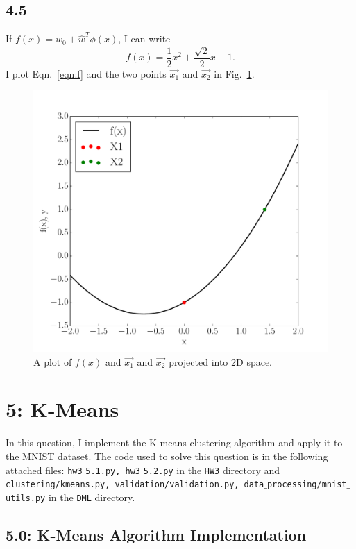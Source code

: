 \documentclass[12pt]{amsart}
\begin{document}
\subsection*{4.5}
If $f(x) = w_0 + \hat{w}^T \phi(x)$, I can write
\begin{equation} \label{eqn:f}
f(x) = \frac{1}{2}x^2 + \frac{\sqrt{2}}{2}x - 1.
\end{equation}
I plot Eqn.~\ref{eqn:f} and the two points $\vec{x_1}$ and $\vec{x_2}$ in Fig.~\ref{fig:svm}.

\begin{figure}[H]
	\includegraphics[width=\columnwidth]{svm_by_hand.pdf}
    \caption{A plot of $f(x)$ and $\vec{x_1}$ and $\vec{x_2}$ projected into 2D space.}
    \label{fig:svm}
\end{figure}

\section*{5: K-Means}

In this question, I implement the K-means clustering algorithm and apply it to the MNIST dataset.  The code used to solve this question is in the following attached files: {\tt hw3$\_$5.1.py, hw3$\_$5.2.py} in the {\tt HW3} directory and {\tt clustering/kmeans.py, validation/validation.py, data$\_$processing/mnist$\_$utils.py} in the {\tt DML} directory.

\subsection*{5.0: K-Means Algorithm Implementation}
\end{document}
